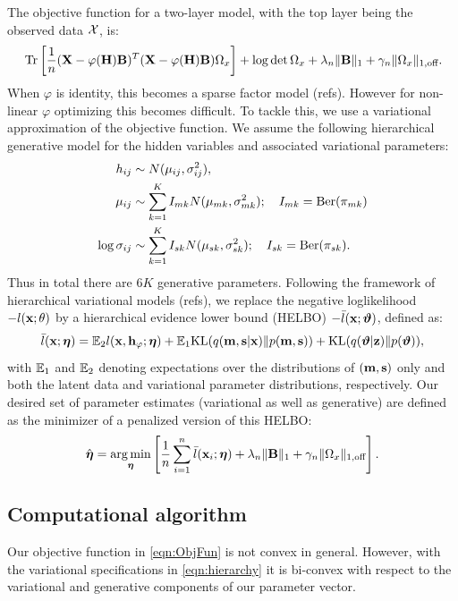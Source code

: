 \documentclass[11pt,letterpaper]{article}
\DeclareMathOperator*{\Tr}{Tr}
\DeclareMathOperator*{\argmin}{arg\,min}
\numberwithin{equation}{section}
\begin{document}
The objective function for a two-layer model, with the top layer being the observed data ${\cal{X}}$, is:
%
\begin{align*}
&\Tr \left[ \frac{1}{n} (\bfX - \varphi(\bfH) \bfB )^T (\bfX - \varphi(\bfH) \bfB ) \Omega_x \right] + 
\log \det \Omega_x + \lambda_n \| \bfB\|_1 +
\gamma_n \| \Omega_x \|_{1,\text{off}}.\\
\end{align*}
%
When $\varphi$ is identity, this becomes a sparse factor model (refs). However for non-linear $\varphi$ optimizing this becomes difficult. To tackle this, we use a variational approximation of the objective function. We assume the following hierarchical generative model for the hidden variables and associated variational parameters:
%
\begin{align}
h_{ij} & \sim N(\mu_{ij}, \sigma_{ij}^2), \notag\\
\mu_{ij} & \sim \sum_{k=1}^K I_{mk} N(\mu_{mk}, \sigma_{mk}^2); \quad I_{mk} = \text{Ber}(\pi_{mk}) \notag\\
\log \sigma_{ij} & \sim \sum_{k=1}^K I_{sk} N(\mu_{sk}, \sigma_{sk}^2); \quad I_{sk} = \text{Ber}(\pi_{sk}). \label{eqn:hierarchy}
\end{align}
%
Thus in total there are $6K$ generative parameters. Following the framework of hierarchical variational models (refs), we replace the negative loglikelihood $-l ({\bf{x}}; \theta)$ by a hierarchical evidence lower bound (HELBO) $-\bar l ({\bf{x}}; {\boldsymbol{\vartheta}})$, defined as:
%
$$
\bar l({\bf{x}}; {\boldsymbol{\eta}}) = {\mathbb{E}}_2 l({\bf{x}}, {\bf{h}}_\varphi; {\boldsymbol{\eta}}) +
{\mathbb{E}}_1 \text{KL}(q({\bf{m}}, {\bf{s}}| {\bf{x}})\| p({\bf{m}}, {\bf{s}})) +
\text{KL} (q({\boldsymbol{\vartheta}}| {\bf{z}}) \|  p({\boldsymbol{\vartheta}})),
$$
%
with ${\mathbb{E}}_1$ and ${\mathbb{E}}_2$ denoting expectations over the distributions of $({\bf{m}}, {\bf{s}})$ only and both the latent data and variational parameter distributions, respectively. Our desired set of parameter estimates (variational as well as generative) are defined as the minimizer of a penalized version of this HELBO:
%
\begin{align}\label{eqn:ObjFun}
\hat \bfeta = \argmin_\bfeta \left[ \frac{1}{n} \sum_{i=1}^n
\bar l(\bfx_i; \bfeta) + \lambda_n \| \bfB\|_1 +
\gamma_n \| \Omega_x \|_{1,\text{off}} \right].
\end{align}

\subsection{Computational algorithm}
Our objective function in \eqref{eqn:ObjFun} is not convex in general. However, with the variational specifications in \eqref{eqn:hierarchy} it is bi-convex with respect to the variational and generative components of our parameter vector.
\end{document}
